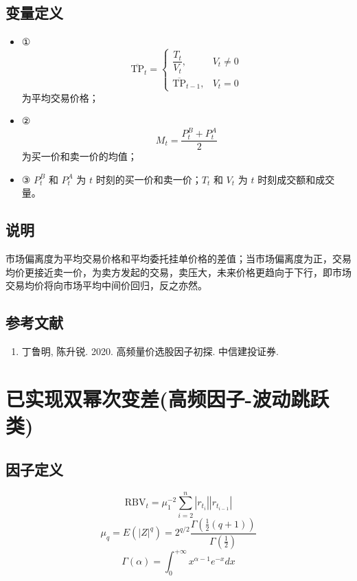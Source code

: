 \documentclass{article}
\begin{document}
\subsection{变量定义}
\begin{itemize}
    \item ①
        \begin{equation*}
            \overline{\mathrm{TP}}_t = 
            \begin{cases} 
                \dfrac{T_t}{V_t}, & V_t \neq 0 \\[6pt]
                \overline{\mathrm{TP}}_{t-1}, & V_t = 0
            \end{cases}
        \end{equation*}
        为平均交易价格；
    \item ②
        \begin{equation*}
            M_t = \frac{P_t^B + P_t^A}{2}
        \end{equation*}
        为买一价和卖一价的均值；
    \item ③ \(P_t^B\) 和 \(P_t^A\) 为 \(t\) 时刻的买一价和卖一价；\(T_t\) 和 \(V_t\) 为 \(t\) 时刻成交额和成交量。
\end{itemize}

\subsection{说明}
市场偏离度为平均交易价格和平均委托挂单价格的差值；当市场偏离度为正，交易均价更接近卖一价，为卖方发起的交易，卖压大，未来价格更趋向于下行，即市场交易均价将向市场平均中间价回归，反之亦然。

\subsection{参考文献}
\begin{enumerate}
    \item 丁鲁明, 陈升锐. 2020. 高频量价选股因子初探. 中信建投证券.
\end{enumerate}

\section{已实现双幂次变差(高频因子-波动跳跃类)}

\subsection{因子定义}
\begin{equation}
    \mathrm{RBV}_t = \mu_1^{-2} \sum_{i=2}^n |r_{t_i}| |r_{t_{i-1}}|
\end{equation}
\begin{equation}
    \mu_q = E(|Z|^q) = 2^{q/2} \frac{\Gamma\left(\frac{1}{2}(q+1)\right)}{\Gamma\left(\frac{1}{2}\right)}
\end{equation}
\begin{equation}
    \Gamma(\alpha) = \int_0^{+\infty} x^{\alpha-1} e^{-x} dx
\end{equation}
\end{document}
